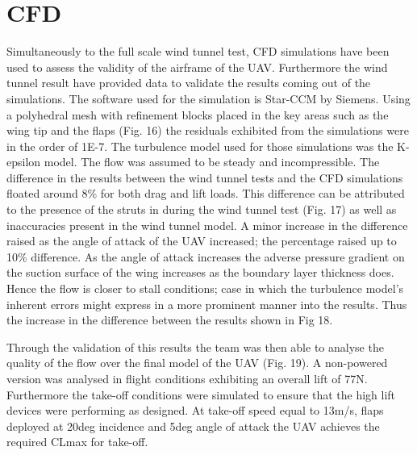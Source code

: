 \documentclass[../../main.tex]{subfiles}
\begin{document}

\section{CFD} \label{sec:testing-and-evaluation:cfd}

Simultaneously to the full scale wind tunnel test, CFD simulations have been used to assess the validity of the airframe of the UAV.
Furthermore the wind tunnel result have provided data to validate the results coming out of the simulations.
The software used for the simulation is Star-CCM by Siemens.
Using a polyhedral mesh with refinement blocks placed in the key areas such as the wing tip and the flaps (Fig. 16) the residuals exhibited from the simulations were in the order of 1E-7.
The turbulence model used for those simulations was the K-epsilon model.
The flow was assumed to be steady and incompressible.
The difference in the results between the wind tunnel tests and the CFD simulations floated around 8\% for both drag and lift loads.
This difference can be attributed to the presence of the struts in during the wind tunnel test (Fig. 17) as well as inaccuracies present in the wind tunnel model.
A minor increase in the difference raised as the angle of attack of the UAV increased; the percentage raised up to 10\% difference.
As the angle of attack increases the adverse pressure gradient on the suction surface of the wing increases as the boundary layer thickness does.
Hence the flow is closer to stall conditions; case in which the turbulence model’s inherent errors might express in a more prominent manner into the results.
Thus the increase in the difference between the results shown in Fig 18. 


Through the validation of this results the team was then able to analyse the quality of the flow over the final model of the UAV (Fig. 19).
A non-powered version was analysed in flight conditions exhibiting an overall lift of 77N.
Furthermore the take-off conditions were simulated to ensure that the high lift devices were performing as designed.
At take-off speed equal to 13m/s, flaps deployed at 20deg incidence and 5deg angle of attack the UAV achieves the required CLmax for take-off. 

\end{document}
